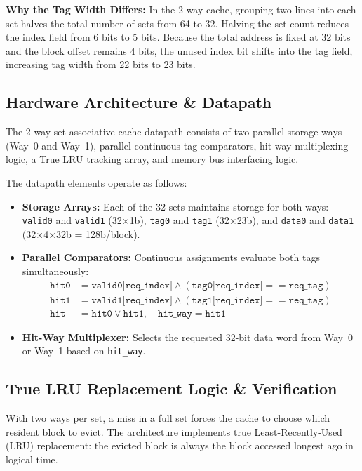 \documentclass[journal,10pt,twocolumn]{IEEEtran}
\begin{document}
\textbf{Why the Tag Width Differs:} In the 2-way cache, grouping two lines into each set halves the total number of sets from 64 to 32. Halving the set count reduces the index field from 6 bits to 5 bits. Because the total address is fixed at 32 bits and the block offset remains 4 bits, the unused index bit shifts into the tag field, increasing tag width from 22 bits to 23 bits.

\subsection{Hardware Architecture \& Datapath}
The 2-way set-associative cache datapath consists of two parallel storage ways (Way~0 and Way~1), parallel continuous tag comparators, hit-way multiplexing logic, a True LRU tracking array, and memory bus interfacing logic.

The datapath elements operate as follows:
\begin{itemize}
    \item \textbf{Storage Arrays:} Each of the 32 sets maintains storage for both ways: \texttt{valid0} and \texttt{valid1} (32$\times$1b), \texttt{tag0} and \texttt{tag1} (32$\times$23b), and \texttt{data0} and \texttt{data1} (32$\times$4$\times$32b = 128b/block).
    \item \textbf{Parallel Comparators:} Continuous assignments evaluate both tags simultaneously:
    \begin{align*}
        \texttt{hit0} &= \texttt{valid0[req\_index]} \land (\texttt{tag0[req\_index]} == \texttt{req\_tag}) \\
        \texttt{hit1} &= \texttt{valid1[req\_index]} \land (\texttt{tag1[req\_index]} == \texttt{req\_tag}) \\
        \texttt{hit}  &= \texttt{hit0} \lor \texttt{hit1}, \quad \texttt{hit\_way} = \texttt{hit1}
    \end{align*}
    \item \textbf{Hit-Way Multiplexer:} Selects the requested 32-bit data word from Way~0 or Way~1 based on \texttt{hit\_way}.
\end{itemize}

\subsection{True LRU Replacement Logic \& Verification}
With two ways per set, a miss in a full set forces the cache to choose which resident block to evict. The architecture implements true Least-Recently-Used (LRU) replacement: the evicted block is always the block accessed longest ago in logical time.
\end{document}
